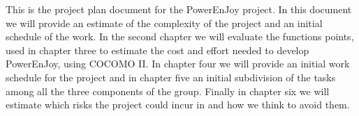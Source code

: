 This is the project plan document for the PowerEnJoy project. In this document we will provide an estimate of the complexity of the project and an initial schedule of the work. In the second chapter we will evaluate the functions points, used in chapter three to estimate the cost and effort needed to develop PowerEnJoy, using COCOMO II. In chapter four we will provide an initial work schedule for the project and in chapter five an initial subdivision of the tasks among all the three components of the group. Finally in chapter six we will estimate which risks the project could incur in and how we think to avoid them. 